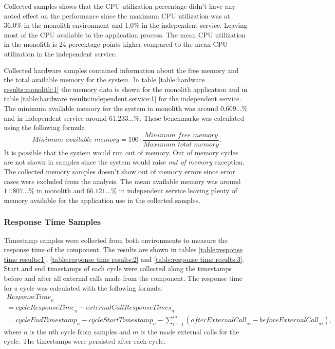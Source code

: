 Collected samples shows that the CPU utilization percentage didn't have any noted effect on the performance since the maximum CPU utilization was at $36.0\%$ in the monolith environment and $1.0\%$ in the independent service.
Leaving most of the CPU available to the application process.
The mean CPU utilization in the monolith is 24 percentage points higher compared to the mean CPU utilization in the independent service.

Collected hardware samples contained information about the free memory and the total available memory for the system.
In table \ref{table:hardware results:monolith:1} the memory data is shown for the monolith application and in table \ref{table:hardware results:independent service:1} for the independent service.
The minimum available memory for the system in monolith was around $0.609...\%$ and in independent service around $61.233...\%$.
These benchmarks was calculated using the following formula
\[
\textit{Minimum available memory} = 100 \cdot \frac{\textit{Minimum free memory}}{\textit{Maximum total memory}}
.\]
It is possible that the system would run out of memory.
Out of memory cycles are not shown in samples since the system would raise \textit{out of memory} exception.
The collected memory samples doesn't show out of memory errors since error cases were excluded from the analysis.
The mean available memory was around $11.807...\%$ in monolith and $66.121...\%$ in independent service leaving plenty of memory available for the application use in the collected samples.

\subsubsection{Response Time Samples}
Timestamp samples were collected from both environments to measure the response time of the component.
The results are shown in tables \ref{table:response time results:1}, \ref{table:response time results:2} and \ref{table:response time results:3}.
Start and end timestamps of each cycle were collected along the timestamps before and after all external calls made from the component.
The response time for a cycle was calculated with the following formula:
\begin{gather*}
\textit{ResponseTime}_n
\\ =\textit{cycleResponseTime}_n - \textit{externalCallResponseTimes}_n
\\ = \textit{cycleEndTimestamp}_n - \textit{cycleStartTimestamp}_n - 
    \sum_{i=1}^{\textit{m}} (\textit{afterExternalCall}_{ni} -     \textit{beforeExternalCall}_{ni}),
\end{gather*}
where $n$ is the nth cycle from samples and $m$ is the made external calls for the cycle.
The timestamps were persisted after each cycle.

